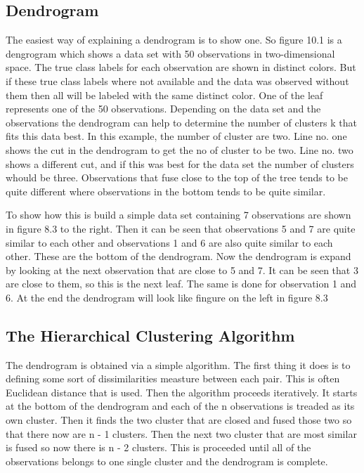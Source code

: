 \subsection{Dendrogram}
The easiest way of explaining a dendrogram is to show one. So figure 10.1 is a dengrogram which shows a data set with 50 observations in two-dimensional space.
The true class labels for each observation are shown in distinct colors. But if these true class labels where not available and the data was observed without them then all will be labeled with the same distinct color. 
One of the leaf represents one of the 50 observations. 
Depending on the data set and the observations the dendrogram can help to determine the number of clusters k that fits this data best. In this example, the number of cluster are two. Line no. one shows the cut in the dendrogram to get the no of cluster to be two. Line no. two shows a different cut, and if this was best for the data set the number of clusters whould be three.
Observations that fuse close to the top of the tree tends to be quite different where observations in the bottom tends to be quite similar. 


To show how this is build a simple data set containing 7 observations are shown in figure 8.3 to the right.
Then it can be seen that observations 5 and 7 are quite similar to each other and observations 1 and 6 are also quite similar to each other. These are the bottom of the dendrogram. Now the dendrogram is expand by looking at the next observation that are close to 5 and 7. It can be seen that 3 are close to them, so this is the next leaf. The same is done for observation 1 and 6. At the end the dendrogram will look like fingure on the left in figure 8.3 


\subsection{The Hierarchical Clustering Algorithm}
The dendrogram is obtained via a simple algorithm. The first thing it does is to defining some sort of dissimilarities measture between each pair. This is often Euclidean distance that is used. Then the algorithm proceeds iteratively. It starts at the bottom of the dendrogram and each of the n observations is treaded as its own cluster. Then it finds the two cluster that are closed and fused those two so that there now are n - 1 clusters. Then the next two cluster that are most similar is fused so now there is n - 2 clusters. This is proceeded until all of the observations belongs to one single cluster and the dendrogram is complete.

